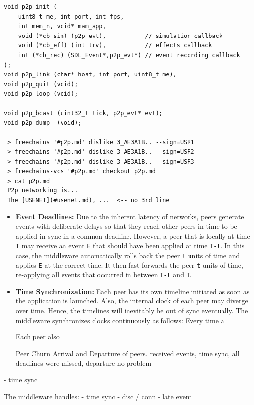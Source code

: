 \documentclass[10pt,journal,compsoc]{IEEEtran}
\newcommand{\code}[1]  {\texttt{\footnotesize{#1}}}
\begin{document}
{\footnotesize
\begin{verbatim}
void p2p_init (
    uint8_t me, int port, int fps,
    int mem_n, void* mam_app,
    void (*cb_sim) (p2p_evt),           // simulation callback
    void (*cb_eff) (int trv),           // effects callback
    int (*cb_rec) (SDL_Event*,p2p_evt*) // event recording callback
);
void p2p_link (char* host, int port, uint8_t me);
void p2p_quit (void);
void p2p_loop (void);

void p2p_bcast (uint32_t tick, p2p_evt* evt);
void p2p_dump  (void);

 > freechains '#p2p.md' dislike 3_AE3A1B.. --sign=USR1
 > freechains '#p2p.md' dislike 3_AE3A1B.. --sign=USR2
 > freechains '#p2p.md' dislike 3_AE3A1B.. --sign=USR3
 > freechains-vcs '#p2p.md' checkout p2p.md
 > cat p2p.md
 P2p networking is...
 The [USENET](#usenet.md), ...  <-- no 3rd line
\end{verbatim}
}


%
\begin{itemize}
\item \textbf{Event Deadlines:}
Due to the inherent latency of networks, peers generate events with deliberate
delays so that they reach other peers in time to be applied in sync in a
common deadline.
However, a peer that is locally at time \code{T} may receive an event \code{E}
that should have been applied at time \code{T-t}.
In this case, the middleware automatically rolls back the peer \code{t} units
of time and applies \code{E} at the correct time.
It then fast forwards the peer \code{t} units of time, re-applying all events
that occurred in between \code{T-t} and \code{T}.
%
\item \textbf{Time Synchronization:}
Each peer has its own timeline initiated as soon as the application is
launched.
Also, the internal clock of each peer may diverge over time.
Hence, the timelines will inevitably be out of sync eventually.
The middleware synchronizes clocks continuously as follows:
Every time a


		Each peer also
%
\item[Peer Churn] Arrival and Departure of peers. received events, time sync, all deadlines were missed, departure no problem
\end{itemize}
- time sync

The middleware handles:
- time sync
- disc / conn
- late event
\end{document}
